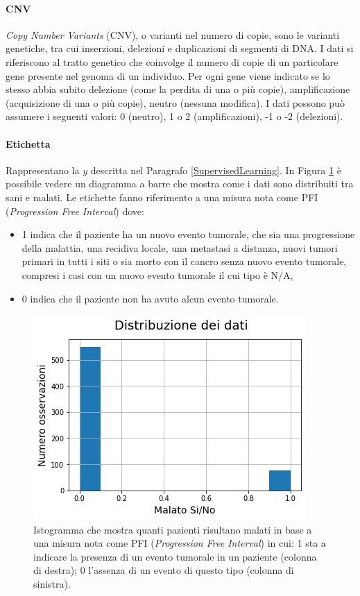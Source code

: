 \documentclass[12pt,italian]{report}
\begin{document}
	\paragraph{CNV}
	\label{CNV}
	\textit{Copy Number Variants} (CNV), o varianti nel numero di copie, sono le varianti genetiche, tra cui inserzioni, delezioni e duplicazioni di segmenti di DNA. I dati si riferiscono al tratto genetico che coinvolge il numero di copie di un particolare gene presente nel genoma di un individuo.  Per ogni gene viene indicato se lo stesso abbia subito delezione (come la perdita di una o più copie), amplificazione (acquisizione di una	o più copie), neutro (nessuna modifica). I dati possono può assumere i seguenti valori: 0 (neutro), 1 o 2 (amplificazioni), -1 o -2 (delezioni).
	
	\paragraph{Etichetta}
	\label{Etichetta}
	Rappresentano la $y$ descritta nel Paragrafo \ref{SupervisedLearning}. In Figura \ref{fig:distribuzionedati} è possibile vedere un diagramma a barre che mostra come i dati sono distribuiti tra sani e malati. Le etichette fanno riferimento a una misura nota come PFI (\textit{Progression Free Interval}) dove: 
	\begin{itemize}
		\item 1 indica che il paziente ha un nuovo evento tumorale, che sia una progressione della malattia, una recidiva locale, una metastasi a distanza, nuovi tumori primari in tutti i siti o sia morto con il cancro senza nuovo evento tumorale, compresi i casi con un nuovo evento tumorale il cui tipo è N/A,
		\item 0 indica che il paziente non ha avuto alcun evento tumorale.
	\end{itemize}

	\begin{figure}[h]
		\centering
		\includegraphics[width=0.7\linewidth]{immagini/distribuzioneDati}
		\caption{Istogramma che mostra quanti pazienti risultano malati in base a una misura nota come PFI (\textit{Progression Free Interval}) in cui: 1 sta a indicare la presenza di un evento tumorale in un paziente (colonna di destra); 0 l'assenza di un evento di questo tipo (colonna di sinistra).}
		\label{fig:distribuzionedati}
	\end{figure}
	
\end{document}
